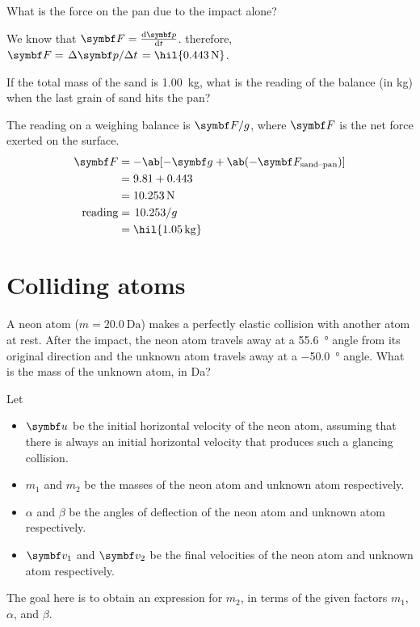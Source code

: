 \begin{problem}
  What is the force on the pan due to the impact alone?
\end{problem}
We know that \(\mv{F} = \odv{\mv{p}}{t}\). therefore, \(\mv{F} =
\lf{\Delta\mv{p}}{\Delta t} = \hil{\qty{0.443}{\newton}}\).

\begin{problem}
  If the total mass of the sand is \qty{1.00}{\kg}, what is the
  reading of the balance (in \unit{\kg}) when the last grain of sand
  hits the pan?
\end{problem}
The reading on a weighing balance is \(\mv{F}/g\), where \(\mv{F}\)
is the net force exerted on the surface.
\begin{align*}
  \mv{F} &= -\ab[-\mv{g} + \ab(-\mv{F}_\text{sand--pan})] \\
  &= 9.81 + 0.443 \\
  &= \qty{10.253}{\newton}\\
  \text{reading} &= \lf{10.253}{g} \\
  &= \hil{\qty{1.05}{\kg}}
\end{align*}

\section{Colliding atoms}
\begin{problem}
  A neon atom (\(m = \qty{20.0}{\dalton}\)) makes a perfectly elastic
  collision with another atom at rest.
  After the impact, the neon atom travels away at a \qty{55.6}{\degree}
  angle from its original direction
  and the unknown atom travels away at a \qty{-50.0}{\degree} angle.
  What is the mass of the unknown atom, in \unit{\dalton}?
\end{problem}

Let
\begin{itemize}
  \item \(\mv{u}\) be the initial horizontal velocity of the neon
    atom, assuming that there is always an initial horizontal
    velocity that produces such a glancing collision.
  \item \(m_1\) and \(m_2\) be the masses of the neon atom and
    unknown atom respectively.
  \item \(\alpha\) and \(\beta\) be the angles of deflection of the
    neon atom and unknown atom respectively.
  \item \(\mv{v}_1\) and \(\mv{v}_2\) be the final velocities of the
    neon atom and unknown atom respectively.
\end{itemize}
The goal here is to obtain an expression for \(m_2\), in terms of the
given factors
\(m_1\), \(\alpha\), and \(\beta\).

